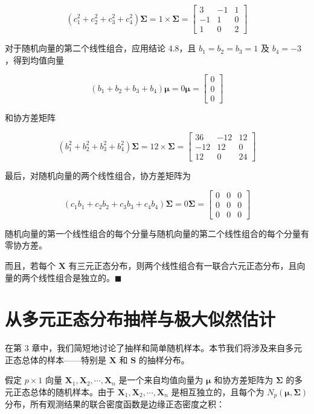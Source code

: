 \[
(c_1^2+c_2^2+c_3^2+c_4^2)\boldsymbol{\Sigma}=1\times\boldsymbol{\Sigma}=\begin{bmatrix}3&-1&1\\-1&1&0\\1&0&2\end{bmatrix}
\]

对于随机向量的第二个线性组合，应用结论 4.8，且 $b_1=b_2=b_3=1$ 及 $b_4=-3$，得到均值向量

\[
(b_1+b_2+b_3+b_4)\boldsymbol{\mu}=0\boldsymbol{\mu}=\begin{bmatrix}0\\0\\0\end{bmatrix}
\]

和协方差矩阵

\[
(b_1^2+b_2^2+b_3^2+b_4^2)\boldsymbol{\Sigma}=12\times\boldsymbol{\Sigma}=\begin{bmatrix}36&-12&12\\-12&12&0\\12&0&24\end{bmatrix}
\]

最后，对随机向量的两个线性组合，协方差矩阵为

\[
(c_1b_1+c_2b_2+c_3b_3+c_4b_4)\boldsymbol{\Sigma}=0\boldsymbol{\Sigma}=\begin{bmatrix}0&0&0\\0&0&0\\0&0&0\end{bmatrix}
\]

随机向量的第一个线性组合的每个分量与随机向量的第二个线性组合的每个分量有零协方差。

而且，若每个 $\mathbf{X}$ 有三元正态分布，则两个线性组合有一联合六元正态分布，且向量的两个线性组合是独立的。\hfill$\blacksquare$

\section{从多元正态分布抽样与极大似然估计}  %
\label{sec:4.3}

在第 3 章中，我们简短地讨论了抽样和简单随机样本。本节我们将涉及来自多元正态总体的样本——特别是 $\mathbf{X}$ 和 $\mathbf{S}$ 的抽样分布。


假定 $p\times1$ 向量 $\mathbf{X}_1,\mathbf{X}_2,\cdots,\mathbf{X}_n$ 是一个来自均值向量为 $\boldsymbol{\mu}$ 和协方差矩阵为 $\boldsymbol{\Sigma}$ 的多元正态总体的随机样本。由于 $\mathbf{X}_1,\mathbf{X}_2,\cdots,\mathbf{X}_n$ 是相互独立的，且每个为 $N_p(\boldsymbol{\mu},\boldsymbol{\Sigma})$ 分布，所有观测结果的联合密度函数是边缘正态密度之积：

